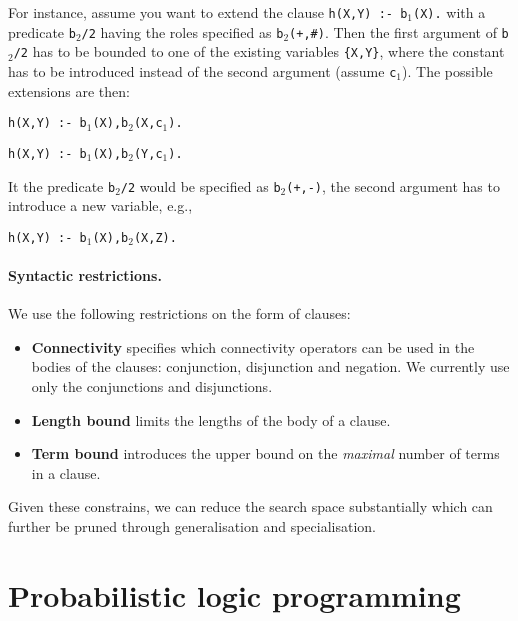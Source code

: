 For instance, assume you want to extend the clause \texttt{h(X,Y) :- b$_1$(X).} with a predicate \texttt{b$_2$/2} having the roles specified as \texttt{b$_2$(+,\#)}.
Then the first argument of \texttt{b$_2$/2} has to be bounded to one of the existing variables \texttt{\{X,Y\}}, where the constant has to be introduced instead of the second argument (assume \texttt{c$_1$}).
The possible extensions are then:
\begin{center}
	\texttt{h(X,Y) :- b$_1$(X),b$_2$(X,c$_1$).}


	\texttt{h(X,Y) :- b$_1$(X),b$_2$(Y,c$_1$).}
\end{center}

It the predicate \texttt{b$_2$/2} would be specified as \texttt{b$_2$(+,-)}, the second argument has to introduce a new variable, e.g.,
\begin{center}
	\texttt{h(X,Y) :- b$_1$(X),b$_2$(X,Z).}
\end{center}


\paragraph{Syntactic restrictions.}
We use the following restrictions on the form of clauses:
\begin{itemize}
	\item \textbf{Connectivity} specifies which connectivity operators can be used in the bodies of the clauses: conjunction, disjunction and negation. We currently use only the conjunctions and disjunctions.
	\item \textbf{Length bound} limits the lengths of the body of a clause.
	\item \textbf{Term bound} introduces the upper bound on the \textit{maximal} number of terms in a clause.
\end{itemize}

Given these constrains, we can reduce the search space substantially which can further be pruned through generalisation and specialisation.









\section{Probabilistic logic programming}



